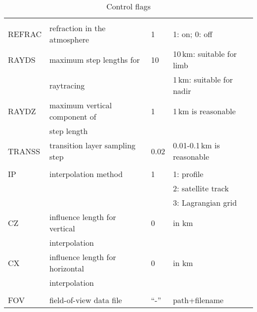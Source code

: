 \begin{table*}
\caption{Control flags}
\begin{tabular}{|l|l|l|l|}
\hline
\cellcolor[RGB]{188,188,188}{flag name} & \cellcolor[RGB]{188,188,188}{purpose} & 
\cellcolor[RGB]{188,188,188}{default} & \cellcolor[RGB]{188,188,188}{options} \\
\hline
\hline
\multicolumn{4}{l}{\cellcolor[RGB]{255,204,230}{Ray-tracing}} \\
\hline
REFRAC         & refraction in the atmosphere    &  1    & 1: on; 0: off \\
RAYDS          & maximum step lengths for        &  10   & 10\,km: suitable for limb \\
               & raytracing                      &       & 1\,km: suitable for nadir \\
RAYDZ          & maximum vertical component of   &  1    & 1\,km is reasonable \\
               & step length                     &       &   \\
TRANSS         & transition layer sampling step  & 0.02  & 0.01-0.1\,km is reasonable \\
\hline
\hline

\multicolumn{4}{l}{\cellcolor[RGB]{255,204,230}{Interpolation of atmospheric data}} \\
\hline
IP             & interpolation method            & 1     & 1: profile \\
               &                                 &       & 2: satellite track \\
               &                                 &       & 3: Lagrangian grid \\ 
CZ             & influence length for vertical   & 0     & in km \\
               & interpolation                   &       &   \\
CX             & influence length for horizontal & 0     & in km \\ 
               & interpolation                   &       &   \\
\hline
\hline

\multicolumn{4}{l}{\cellcolor[RGB]{255,204,230}{Field of view}} \\
\hline
FOV            & field-of-view data file         & ``-'' & path+filename \\
\hline
\hline


\end{tabular}
\end{table*}
